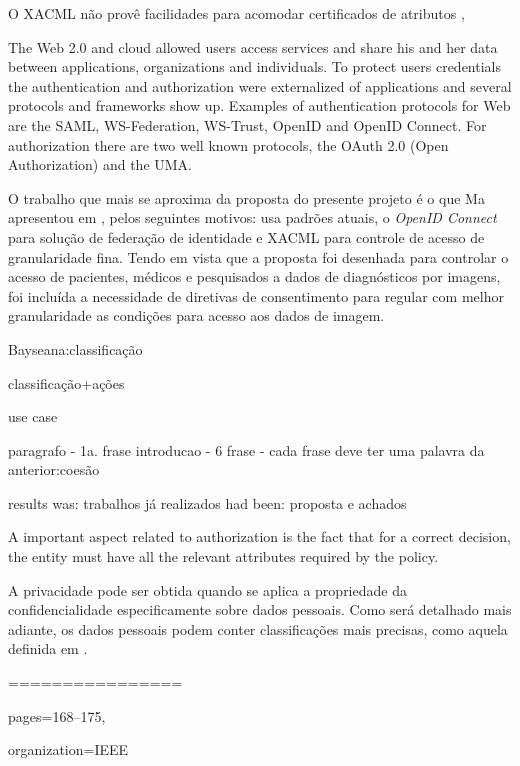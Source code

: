 O XACML não provê facilidades para acomodar certificados de atributos \citep{dagdee2011extending},

The Web 2.0 and cloud allowed users access services and share his and her data between applications, organizations and individuals. To protect users credentials the authentication and authorization were externalized of applications and several protocols and frameworks show up. Examples of authentication protocols for Web are the SAML, WS-Federation, WS-Trust, OpenID and OpenID Connect. For authorization there are two well known protocols, the OAuth 2.0 (Open Authorization) and the UMA.


O trabalho que mais se aproxima da proposta do presente projeto é o que Ma apresentou em \cite{ma2015cloud}, pelos seguintes motivos: usa padrões atuais, o \textit{OpenID Connect} para solução de federação de identidade e XACML para controle de acesso de granularidade fina. Tendo em vista que a proposta foi desenhada para controlar o acesso de pacientes, médicos e pesquisados a dados de diagnósticos por imagens, foi incluída a necessidade de diretivas de consentimento para regular com melhor granularidade as condições para acesso aos dados de imagem. 

Bayseana:classificação

classificação+ações

use case

paragrafo
- 1a. frase introducao
- 6 frase
- cada frase deve ter uma palavra da anterior:coesão

results
was: trabalhos já realizados
had been: proposta e achados

A important aspect related to authorization is the fact that for a correct decision, the entity must have all the relevant attributes required by the policy.

A privacidade pode ser obtida quando se aplica a propriedade da confidencialidade especificamente sobre dados pessoais. Como será detalhado mais adiante, os dados pessoais podem conter classificações mais precisas, como aquela definida em \cite{heurix2015taxonomy}.



================

pages={168--175},


organization={IEEE}


